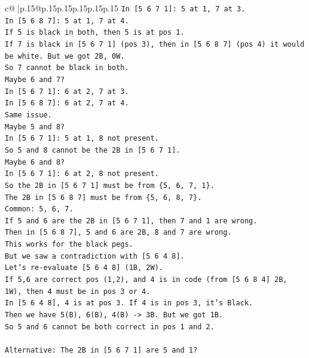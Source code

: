\documentclass{article}
\begin{document}
{\begin{supertabular}{c@{$\;$}|p{.15\linewidth}@{}p{.15\linewidth}p{.15\linewidth}p{.15\linewidth}p{.15\linewidth}p{.15\linewidth}}
{{{\texttt{In {[}5 6 7 1{]}: 5 at 1, 7 at 3.} \\
\texttt{In {[}5 6 8 7{]}: 5 at 1, 7 at 4.} \\
\texttt{If 5 is black in both, then 5 is at pos 1.} \\
\texttt{If 7 is black in {[}5 6 7 1{]} (pos 3), then in {[}5 6 8 7{]} (pos 4) it would be white. But we got 2B, 0W.} \\
\texttt{So 7 cannot be black in both.} \\
\texttt{Maybe 6 and 7?} \\
\texttt{In {[}5 6 7 1{]}: 6 at 2, 7 at 3.} \\
\texttt{In {[}5 6 8 7{]}: 6 at 2, 7 at 4.} \\
\texttt{Same issue.} \\
\texttt{Maybe 5 and 8?} \\
\texttt{In {[}5 6 7 1{]}: 5 at 1, 8 not present.} \\
\texttt{So 5 and 8 cannot be the 2B in {[}5 6 7 1{]}.} \\
\texttt{Maybe 6 and 8?} \\
\texttt{In {[}5 6 7 1{]}: 6 at 2, 8 not present.} \\
\texttt{So the 2B in {[}5 6 7 1{]} must be from \{5, 6, 7, 1\}.} \\
\texttt{The 2B in {[}5 6 8 7{]} must be from \{5, 6, 8, 7\}.} \\
\texttt{Common: 5, 6, 7.} \\
\texttt{If 5 and 6 are the 2B in {[}5 6 7 1{]}, then 7 and 1 are wrong.} \\
\texttt{Then in {[}5 6 8 7{]}, 5 and 6 are 2B, 8 and 7 are wrong.} \\
\texttt{This works for the black pegs.} \\
\texttt{But we saw a contradiction with {[}5 6 4 8{]}.} \\
\texttt{Let's re{-}evaluate {[}5 6 4 8{]} (1B, 2W).} \\
\texttt{If 5,6 are correct pos (1,2), and 4 is in code (from {[}5 6 8 4{]} 2B, 1W), then 4 must be in pos 3 or 4.} \\
\texttt{In {[}5 6 4 8{]}, 4 is at pos 3. If 4 is in pos 3, it's Black.} \\
\texttt{Then we have 5(B), 6(B), 4(B) {-}> 3B. But we got 1B.} \\
\texttt{So 5 and 6 cannot be both correct in pos 1 and 2.} \\
\\ 
\texttt{Alternative: The 2B in {[}5 6 7 1{]} are 5 and 1?} \\
}}}
\end{supertabular}}
\end{document}
